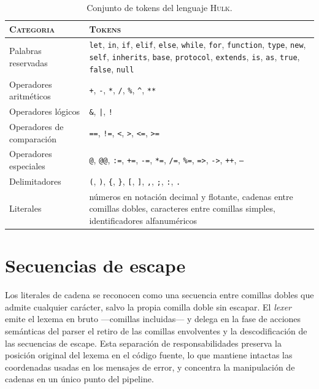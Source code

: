 \documentclass[11pt,a4paper,oneside,openany]{report}
\newcommand{\hulk}{\textsc{Hulk}}
\newcommand{\code}[1]{\texttt{#1}}
\begin{document}
\begin{table}[H]
\centering
\caption{Conjunto de tokens del lenguaje \hulk{}.}
\label{tab:tokens}
\begin{tabularx}{\textwidth}{lX}
\toprule
\textsc{Categoria} & \textsc{Tokens} \\
\midrule
Palabras reservadas      &
  \code{let}, \code{in}, \code{if}, \code{elif}, \code{else},
  \code{while}, \code{for}, \code{function}, \code{type}, \code{new},
  \code{self}, \code{inherits}, \code{base}, \code{protocol},
  \code{extends}, \code{is}, \code{as}, \code{true}, \code{false}, \code{null} \\
Operadores aritméticos   &
  \code{+}, \code{-}, \code{*}, \code{/}, \code{\%}, \code{\^{}}, \code{**} \\
Operadores lógicos       &
  \code{\&}, \code{|}, \code{!} \\
Operadores de comparación &
  \code{==}, \code{!=}, \code{<}, \code{>}, \code{<=}, \code{>=} \\
Operadores especiales    &
  \code{@}, \code{@@}, \code{:=}, \code{+=}, \code{-=}, \code{*=},
  \code{/=}, \code{\%=}, \code{=>}, \code{->}, \code{++}, \code{--} \\
Delimitadores            &
  \code{(}, \code{)}, \code{\{}, \code{\}}, \code{[}, \code{]},
  \code{,}, \code{;}, \code{:}, \code{.} \\
Literales                &
  números en notación decimal y flotante, cadenas entre comillas dobles,
  caracteres entre comillas simples, identificadores alfanuméricos \\
\bottomrule
\end{tabularx}
\end{table}

\section{Secuencias de escape}

Los literales de cadena se reconocen como una secuencia entre comillas dobles que
admite cualquier carácter, salvo la propia comilla doble sin escapar. El
\textit{lexer} emite el lexema en bruto ---comillas incluidas--- y delega en la
fase de acciones semánticas del parser el retiro de las comillas envolventes y la
descodificación de las secuencias de escape. Esta separación de responsabilidades
preserva la posición original del lexema en el código fuente, lo que mantiene
intactas las coordenadas usadas en los mensajes de error, y concentra la
manipulación de cadenas en un único punto del pipeline.
\end{document}
